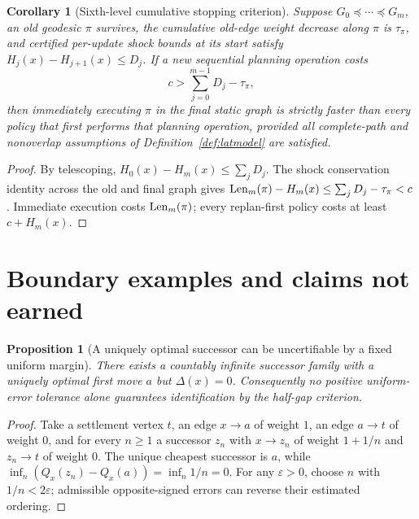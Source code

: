 \documentclass[11pt]{article}
\newtheorem{proposition}[theorem]{Proposition}
\newtheorem{corollary}[theorem]{Corollary}
\theoremstyle{definition}\newtheorem{definition}[theorem]{Definition}\newtheorem{assumption}[theorem]{Assumption}
\theoremstyle{remark}\newtheorem{remark}[theorem]{Remark}
\begin{document}
\begin{corollary}[Sixth-level cumulative stopping criterion]\label{cor:level6}
Suppose $G_0\preceq\cdots\preceq G_m$, an old geodesic $\pi$ survives, the cumulative old-edge weight decrease along $\pi$ is $\tau_{\pi}$, and certified per-update shock bounds at its start satisfy $H_j(x)-H_{j+1}(x)\leq D_j$. If a new sequential planning operation costs
\[
c>\sum_{j=0}^{m-1}D_j-\tau_{\pi},
\]
then immediately executing $\pi$ in the final static graph is strictly faster than every policy that first performs that planning operation, provided all complete-path and nonoverlap assumptions of Definition~\ref{def:latmodel} are satisfied.
\end{corollary}
\begin{proof}
By telescoping, $H_0(x)-H_m(x)\leq\sum_jD_j$. The shock conservation identity across the old and final graph gives $\operatorname{Len}_m(\pi)-H_m(x)\leq\sum_jD_j-\tau_{\pi}<c$. Immediate execution costs $\operatorname{Len}_m(\pi)$; every replan-first policy costs at least $c+H_m(x)$.
\end{proof}
\par


\section{Boundary examples and claims not earned}
\label{sec:limits}
\begin{proposition}[A uniquely optimal successor can be uncertifiable by a fixed uniform margin]
There exists a countably infinite successor family with a uniquely optimal first move $a$ but $\Delta(x)=0$. Consequently no positive uniform-error tolerance alone guarantees identification by the half-gap criterion.
\end{proposition}
\begin{proof}
Take a settlement vertex $t$, an edge $x\to a$ of weight $1$, an edge $a\to t$ of weight $0$, and for every $n\geq1$ a successor $z_n$ with $x\to z_n$ of weight $1+1/n$ and $z_n\to t$ of weight $0$. The unique cheapest successor is $a$, while $\inf_n(Q_x(z_n)-Q_x(a))=\inf_n1/n=0$. For any $\varepsilon>0$, choose $n$ with $1/n<2\varepsilon$; admissible opposite-signed errors can reverse their estimated ordering.
\end{proof}
\par
\end{document}
